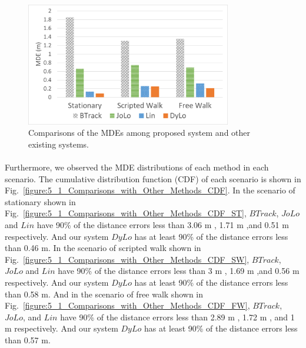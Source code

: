 \documentclass[a4paper,12pt]{report}
\begin{document}
\begin{figure}[tbph]
    \begin{center}
    \includegraphics[width=0.8\textwidth]{images/5_1_Comparisons_with_Other_Methods_MDE.png}
    \caption{Comparisons of the MDEs among proposed system and other existing systems.}
    \label{figure:5_1_Comparisons_with_Other_Methods_MDE}
    \end{center}
\end{figure}

\paragraph{}
Furthermore, we observed the MDE distributions of each method in each scenario. The cumulative distribution function (CDF) of each scenario is shown in Fig.~\ref{figure:5_1_Comparisons_with_Other_Methods_CDF}. In the scenario of stationary shown in Fig.~\ref{figure:5_1_Comparisons_with_Other_Methods_CDF_ST}, $BTrack$, $JoLo$ and $Lin$ have 90\% of the distance errors less than 3.06 m , 1.71 m ,and 0.51 m respectively. And our system $DyLo$ has at least 90\% of the distance errors less than 0.46 m. In the scenario of scripted walk shown in Fig.~\ref{figure:5_1_Comparisons_with_Other_Methods_CDF_SW}, $BTrack$, $JoLo$ and $Lin$ have 90\% of the distance errors less than 3 m , 1.69 m ,and 0.56 m respectively. And our system $DyLo$ has at least 90\% of the distance errors less than 0.58 m. And in the scenario of free walk shown in Fig.~\ref{figure:5_1_Comparisons_with_Other_Methods_CDF_FW}, $BTrack$, $JoLo$, and $Lin$ have 90\% of the distance errors less than 2.89 m , 1.72 m , and 1 m respectively. And our system $DyLo$ has at least 90\% of the distance errors less than 0.57 m.
\end{document}
